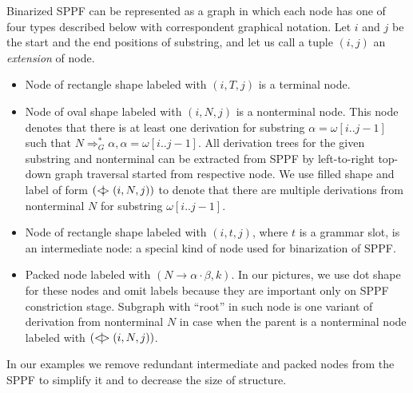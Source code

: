 

Binarized SPPF can be represented as a graph in which each node has one of four types described below with correspondent graphical notation.
Let $i$ and $j$ be the start and the end positions of substring, and let us call a tuple $(i,j)$ an \textit{extension} of node.

\begin{itemize}
    \item Node of rectangle shape labeled with $(i, T, j)$ is a terminal node.     
    \item Node of oval shape labeled with $(i, N, j)$ is a nonterminal node. 
    This node denotes that there is at least one derivation for substring $\alpha=\omega[i..j-1]$ such that $N \Rightarrow^*_G \alpha, \alpha = \omega[i..j-1] $.
    All derivation trees for the given substring and nonterminal can be extracted from SPPF by left-to-right top-down graph traversal started from respective node. 
    We use filled shape and label of form $(<\mkern-11mu | \mkern-11mu> (i, N, j))$ to denote that there are multiple derivations from nonterminal $N$ for substring $\omega[i..j-1]$.
    \item Node of rectangle shape labeled with $(i,t,j)$, where $t$ is a grammar slot, is an intermediate node: a special kind of node used for binarization of SPPF.
    \item Packed node labeled with $(N \rightarrow \alpha \cdot \beta, k)$. In our pictures, we use dot shape for these nodes and omit labels because they are important only on SPPF constriction stage.
    Subgraph with ``root'' in such node is one variant of derivation from nonterminal $N$ in case when the parent is a nonterminal node labeled with $(<\mkern-9mu | \mkern-9mu> (i, N, j))$.

\end{itemize}

In our examples we remove redundant intermediate and packed nodes from the SPPF to simplify it and to decrease the size of structure.
